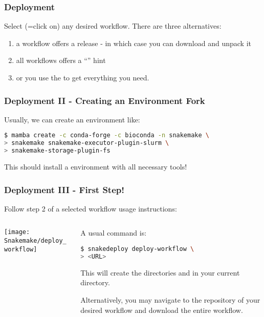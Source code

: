 \begin{frame}[fragile]
  \frametitle{Deployment}
  Select (=click on) any desired workflow. There are three alternatives:
  \begin{enumerate}[<+->]
   \item a workflow offers a release - in which case you can download and unpack it
   \item all workflows offers a ``'' hint
   \item or you use the  to get everything you need.
  \end{enumerate}
\end{frame}

\begin{frame}[fragile]
	\frametitle{Deployment II - Creating an Environment Fork}
	Usually, we can create an environment like:
	\begin{lstlisting}[language=Bash, style=Shell]
$ mamba create -c conda-forge -c bioconda -n snakemake \
> snakemake snakemake-executor-plugin-slurm \
> snakemake-storage-plugin-fs
    \end{lstlisting}
    This should install a \Snakemake{} environment with all necessary tools!
       
\end{frame}

\begin{frame}[fragile]
	\frametitle{Deployment III - First Step!}
	Follow step 2 of a selected workflow usage instructions:
	\begin{columns}
		\begin{column}{0.4\textwidth}
			\centering
			\texttt{[image: Snakemake/deploy\_workflow]}
		\end{column}
	    \begin{column}{0.6\textwidth}
	    	A usual command is:
	    	\begin{lstlisting}[language=Bash, style=Shell]
$ snakedeploy deploy-workflow \
> <URL>
	    	\end{lstlisting}
    	    This will create the directories  and  in your current directory.
    	    \begin{hint}
    	    	Alternatively, you may navigate to the repository of your desired workflow and download the entire workflow.
    	    \end{hint}
	    \end{column}
	\end{columns}
\end{frame}

